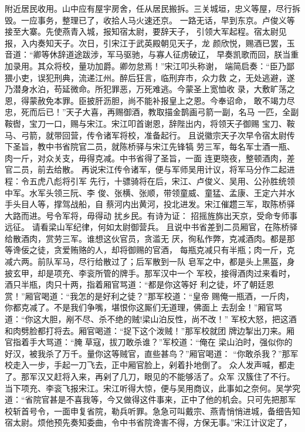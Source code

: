 附近居民收用。山中应有屋宇房舍，任从居民搬拆。三关城垣，忠义等屋，尽行拆
毁。一应事务，整理已了，收拾人马火速还京。
一路无话，早到东京。卢俊义等接至大寨。先使燕青入城，报知宿太尉，要辞天子，
引领大军起程。宿太尉见报，入内奏知天子。次日，引宋江于武英殿朝见天子，龙
颜欣悦，赐酒已罢，玉音道：“卿等休辞道途跋涉，军马驱驰，与寡人征虏破辽，
早奏凯歌而回，朕当重加录用。其众将校，量功加爵。卿勿怠焉！”宋江叩头称谢，
端简启奏：“臣乃鄙猥小吏，误犯刑典，流递江州。醉后狂言，临刑弃市，众力救
之，无处逃避，遂乃潜身水泊，苟延微命。所犯罪恶，万死难逃。今蒙圣上宽恤收
录，大敷旷荡之恩，得蒙赦免本罪。臣披肝沥胆，尚不能补报皇上之恩。今奉诏命，
敢不竭力尽忠，死而后已！”天子大喜，再赐御酒，教取描金鹊画弓箭一副，名马
一匹，全副鞍辔，宝刀一口，赐与宋江。宋江叩首谢恩，辞陛出内，将领天子御赐
宝刀、鞍马、弓箭，就带回营，传令诸军将校，准备起行。
且说徽宗天子次早令宿太尉传下圣旨，教中书省院官二员，就陈桥驿与宋江先锋犒
劳三军，每名军士酒一瓶、肉一斤，对众关支，毋得克减。中书省得了圣旨，一面
连更晓夜，整顿酒肉，差官二员，前去给散。
再说宋江传令诸军，便与军师吴用计议，将军马分作二起进程：令五虎八彪将引军
先行，十骠骑将在后，宋江、卢俊义、吴用、公孙胜统领中军。水军头领三阮、李
俊、张横、张顺，带领童威、童猛、孟康、王定六并水手头目人等，撑驾战船，自
蔡河内出黄河，投北进发。宋江催趱三军，取陈桥驿大路而进。号令军将，毋得动
扰乡民。有诗为证：
招摇旌旆出天京，受命专师事远征。
请看梁山军纪律，何如太尉御营兵。
且说中书省差到二员厢官，在陈桥驿给散酒肉，赏劳三军。谁想这伙官员，贪滥无
厌，徇私作弊，克减酒肉。都是那等谗佞之徒，贪爱贿赂的人，却将御赐的官酒，
每瓶克减只有半瓶；肉一斤，克减六两。前队军马，尽行给散过了；后军散到一队
皂军之中，都是头上黑盔，身披玄甲，却是项充、李衮所管的牌手。那军汉中一个
军校，接得酒肉过来看时，酒只半瓶，肉只十两，指着厢官骂道：“都是你这等好
利之徒，坏了朝廷恩赏！”厢官喝道：“我怎的是好利之徒？”那军校道：“皇帝
赐俺一瓶酒，一斤肉，你都克减了。不是我们争嘴，堪恨你这厮们无道理，佛面上
去刮金！”厢官骂道：“你这大胆，剐不尽、杀不绝的贼!梁山泊反性，尚不改！”
军校大怒，把这酒和肉劈脸都打将去。厢官喝道：“捉下这个泼贼！”那军校就团
牌边掣出刀来。厢官指着手大骂道：“腌草寇，拔刀敢杀谁？”军校道：“俺在
梁山泊时，强似你的好汉，被我杀了万千。量你这等贼官，直些甚鸟？”厢官喝道：
“你敢杀我？”那军校走入一步，手起一刀飞去，正中厢官脸上，剁着扑地倒了。
众人发声喊，都走了。那军汉又赶将入来，再剁了几刀，眼见的不能够活了。众军
汉簇住了不行。
当下项充、李衮飞报宋江。宋江听得大惊，便与吴用商议，此事如之奈何。吴学究
道：“省院官甚是不喜我等，今又做得这件事来，正中了他的机会。只可先把那军
校斩首号令，一面申复省院，勒兵听罪。急急可叫戴宗、燕青悄悄进城，备细告知
宿太尉。烦他预先奏知委曲，令中书省院谗害不得，方保无事。”宋江计议定了，
